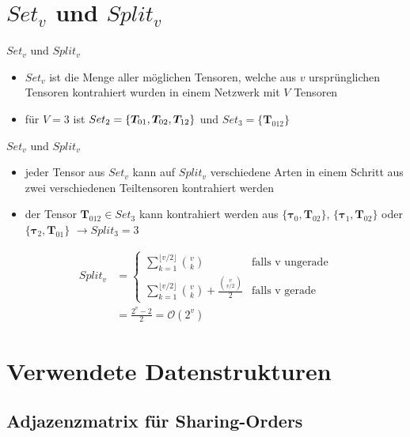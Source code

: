 \documentclass{beamer}
\begin{document}
	\section{$Set_v$ und $Split_v$}

		\begin{frame}{$Set_v$ und $Split_v$}
			\begin{itemize}
				\item $Set_v$ ist die Menge aller möglichen Tensoren, welche aus $v$ ursprünglichen Tensoren kontrahiert wurden in einem Netzwerk mit $V$ Tensoren
				\item für $V = 3$ ist $Set_2 = \{\bm{T}_{01}, \bm{T_}{02}, \bm{T}_{12} \}$ und $Set_3 = \{\bm{T}_{012} \}$
			\end{itemize}
		\end{frame}

		\begin{frame}{$Set_v$ und $Split_v$}
			\begin{itemize}
				\item jeder Tensor aus $Set_v$ kann auf $Split_v$ verschiedene Arten in einem Schritt aus zwei verschiedenen Teiltensoren kontrahiert werden
				\item der Tensor $\bm{T}_{012} \in Set_3$ kann kontrahiert werden aus $\{\bm{\tau}_0, \bm{T}_{02} \}$, $\{\bm{\tau}_{1}, \bm{T}_{02} \}$ oder $\{\bm{\tau}_{2}, \bm{T}_{01} \}$ $\rightarrow Split_3 = 3$
			\end{itemize}
			\begin{align*}
				Split_v &= \begin{cases}
					\sum^{\lfloor v/2 \rfloor}_{k=1} \binom{v}{k} &\text{falls v ungerade} \\
					\sum^{\lfloor v/2 \rfloor}_{k=1} \binom{v}{k} + \frac{\binom{v}{v/2}}{2} & \text{falls v gerade}
				\end{cases} \\
				&= \frac{2^v - 2}{2} = \mathcal{O}(2^v)
			\end{align*}
		\end{frame}
	
	
		\section{Verwendete Datenstrukturen}
		\subsection{Adjazenzmatrix für Sharing-Orders}
\end{document}
